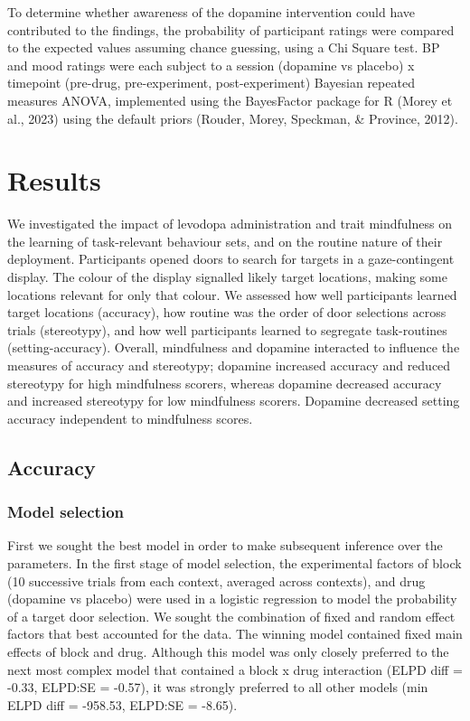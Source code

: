 \documentclass[
  man]{apa6}
\begin{document}
\label{sec:Blinding analyses}

To determine whether awareness of the dopamine intervention could have contributed to the findings, the probability of participant ratings were compared to the expected values assuming chance guessing, using a Chi Square test. BP and mood ratings were each subject to a session (dopamine vs placebo) x timepoint (pre-drug, pre-experiment, post-experiment) Bayesian repeated measures ANOVA, implemented using the BayesFactor package for R (Morey et al., 2023) using the default priors (Rouder, Morey, Speckman, \& Province, 2012).

\hypertarget{results}{%
\section{Results}\label{results}}

\label{sec:Results}

We investigated the impact of levodopa administration and trait mindfulness on the learning of task-relevant behaviour sets, and on the routine nature of their deployment. Participants opened doors to search for targets in a gaze-contingent display. The colour of the display signalled likely target locations, making some locations relevant for only that colour. We assessed how well participants learned target locations (accuracy), how routine was the order of door selections
across trials (stereotypy), and how well participants learned to segregate task-routines (setting-accuracy). Overall, mindfulness and dopamine interacted to influence the measures of accuracy and stereotypy; dopamine increased accuracy and reduced stereotypy for high mindfulness scorers, whereas dopamine decreased accuracy and increased stereotypy for low mindfulness scorers. Dopamine decreased setting accuracy independent to mindfulness scores.

\hypertarget{accuracy-1}{%
\subsection{Accuracy}\label{accuracy-1}}

\label{sec:Accuracy Results}

\hypertarget{model-selection}{%
\subsubsection{Model selection}\label{model-selection}}

First we sought the best model in order to make subsequent inference over the parameters. In the first stage of model selection, the experimental factors of block (10 successive trials from each context, averaged across contexts), and drug (dopamine vs placebo) were used in a logistic regression to model the probability of a target door selection. We sought the combination of fixed and random effect factors that best accounted for the data. The winning model contained fixed main effects of block and drug. Although this model was only closely preferred to the next most complex model that contained a block x drug interaction (ELPD diff = -0.33, ELPD:SE = -0.57), it was strongly preferred to all other models (min ELPD diff = -958.53, ELPD:SE = -8.65).
\end{document}
